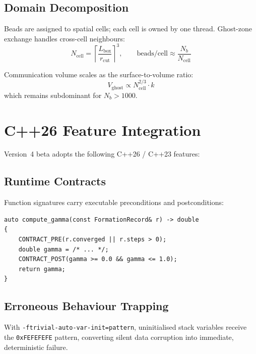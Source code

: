 \documentclass[11pt]{article}
\newcommand{\var}[1]{\ensuremath{\mathrm{#1}}}
\begin{document}
\subsection{Domain Decomposition}

Beads are assigned to spatial cells; each cell is owned by one thread.
Ghost-zone exchange handles cross-cell neighbours:
\begin{equation}
  N_\var{cell} = \left\lceil\frac{L_\var{box}}{r_\var{cut}}\right\rceil^3,
  \qquad
  \text{beads/cell} \approx \frac{N_b}{N_\var{cell}}
\end{equation}

Communication volume scales as the surface-to-volume ratio:
\begin{equation}
  V_\var{ghost} \propto N_\var{cell}^{2/3} \cdot k
\end{equation}
which remains subdominant for $N_b > 1000$.

\section{C++26 Feature Integration}
\label{sec:cpp26}

Version~4 beta adopts the following C++26 / C++23 features:

\subsection{Runtime Contracts}

Function signatures carry executable preconditions and postconditions:
\begin{lstlisting}
auto compute_gamma(const FormationRecord& r) -> double
{
    CONTRACT_PRE(r.converged || r.steps > 0);
    double gamma = /* ... */;
    CONTRACT_POST(gamma >= 0.0 && gamma <= 1.0);
    return gamma;
}
\end{lstlisting}

\subsection{Erroneous Behaviour Trapping}

With \texttt{-ftrivial-auto-var-init=pattern}, uninitialised stack
variables receive the \texttt{0xFEFEFEFE} pattern, converting silent
data corruption into immediate, deterministic failure.
\end{document}
